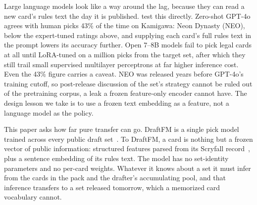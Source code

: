 Large language models look like a way around the lag, because they can
read a new card's rules text the day it is published.
\citet{bertram2025urzagpt} test this directly. Zero-shot GPT-4o agrees
with human picks 43\% of the time on Kamigawa: Neon Dynasty (NEO), below
the expert-tuned ratings above, and supplying each card's full rules text
in the prompt lowers its accuracy further. Open 7--8B models fail to pick
legal cards at all until LoRA-tuned on a million picks from the target
set, after which they still trail small supervised multilayer perceptrons
at far higher inference cost. Even the 43\% figure carries a caveat. NEO
was released years before GPT-4o's training cutoff, so post-release
discussion of the set's strategy cannot be ruled out of the pretraining
corpus, a leak a frozen feature-only encoder cannot have. The design
lesson we take is to use a frozen text embedding as a feature, not a
language model as the policy.

This paper asks how far pure transfer can go. DraftFM is a single pick
model trained across every public \seventeenlands{} draft
set~\citep{seventeenlands}. To DraftFM, a card is nothing but a frozen
vector of public information: structured features parsed from its
Scryfall record~\citep{scryfall}, plus a sentence embedding of its rules
text. The model has no set-identity parameters and no per-card weights.
Whatever it knows about a set it must infer from the cards in the pack and
the drafter's accumulating pool, and that inference transfers to a set
released tomorrow, which a memorized card vocabulary cannot.

